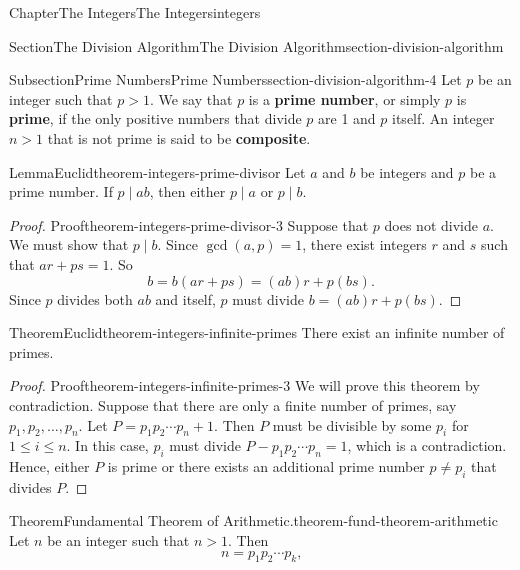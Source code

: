 \documentclass[oneside,10pt,]{book}
\newcommand{\terminology}[1]{\textbf{#1}}
\numberwithin{equation}{section}
\newcommand{\gt}{>}
\begin{document}
\begin{chapterptx}{Chapter}{The Integers}{}{The Integers}{}{}{integers}
\begin{sectionptx}{Section}{The Division Algorithm}{}{The Division Algorithm}{}{}{section-division-algorithm}
%
%
\typeout{************************************************}
\typeout{************************************************}
%
\begin{subsectionptx}{Subsection}{Prime Numbers}{}{Prime Numbers}{}{}{section-division-algorithm-4}
Let \(p\) be an integer such that \(p \gt 1\).  We say that \(p\) is a \terminology{prime number}, or simply \(p\) is \terminology{prime}, if the only positive numbers that divide \(p\) are 1 and \(p\) itself.  An integer \(n \gt 1\) that is not prime is said to be \terminology{composite}.%
\begin{lemma}{Lemma}{}{Euclid}{theorem-integers-prime-divisor}%
Let \(a\) and \(b\) be integers and \(p\) be a prime number.  If \(p \mid ab\), then either \(p \mid a\) or \(p \mid b\).%
\end{lemma}
\begin{proof}{Proof}{}{theorem-integers-prime-divisor-3}
Suppose that \(p\) does not divide \(a\).  We must show that \(p \mid b\). Since \(\gcd( a, p ) = 1\), there exist integers \(r\) and \(s\) such that \(ar + ps = 1\).  So%
\begin{equation*}
b = b(ar + ps) = (ab)r + p(bs)\text{.}
\end{equation*}
Since \(p\) divides both \(ab\) and itself, \(p\) must divide \(b = (ab)r + p(bs)\).%
\end{proof}
\begin{theorem}{Theorem}{}{Euclid}{theorem-integers-infinite-primes}%
There exist an infinite number of primes.%
\end{theorem}
\begin{proof}{Proof}{}{theorem-integers-infinite-primes-3}
We will prove this theorem by contradiction.  Suppose that there are only a finite number of primes, say \(p_1, p_2, \ldots, p_n\).  Let \(P = p_1  p_2  \cdots  p_n + 1\).    Then \(P\) must be divisible by some \(p_i\) for \(1 \leq i \leq n\). In this  case, \(p_i\) must divide \(P - p_1 p_2 \cdots p_n = 1\), which is a contradiction.  Hence, either \(P\) is prime or there exists an additional prime number \(p \neq p_i\) that divides \(P\).%
\end{proof}
\begin{theorem}{Theorem}{Fundamental Theorem of Arithmetic.}{}{theorem-fund-theorem-arithmetic}%
%
Let \(n\) be an integer such that \(n \gt 1\). Then%
\begin{equation*}
n = p_1 p_2 \cdots p_k\text{,}

\end{equation*}
\end{theorem}
\end{subsectionptx}
\end{sectionptx}
\end{chapterptx}
\end{document}
